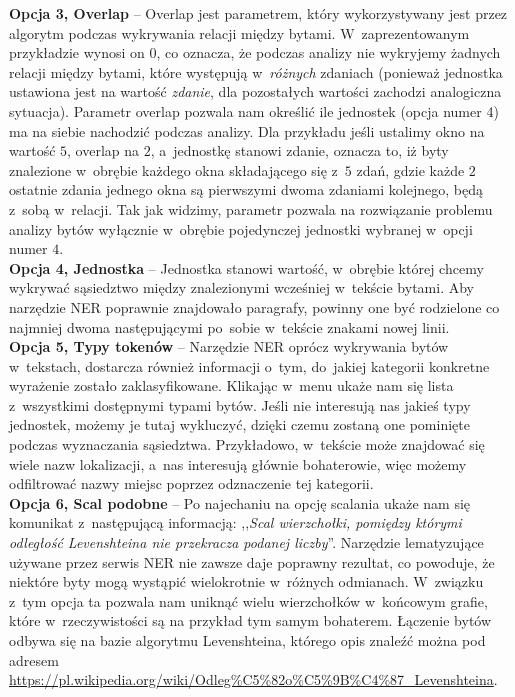 \documentclass[12pt, a4paper]{article}
\begin{document}
\noindent\textbf{Opcja 3, Overlap} -- Overlap jest parametrem, który wykorzystywany jest przez algorytm podczas wykrywania relacji między bytami. W~zaprezentowanym przykładzie wynosi on $0$, co oznacza, że podczas analizy nie wykryjemy żadnych relacji między bytami, które występują w~\textit{różnych} zdaniach (ponieważ jednostka ustawiona jest na wartość \textit{zdanie}, dla pozostałych wartości zachodzi analogiczna sytuacja). Parametr overlap pozwala nam określić ile jednostek (opcja numer 4) ma na siebie nachodzić podczas analizy. Dla przykładu jeśli ustalimy okno na wartość $5$, overlap na $2$, a~jednostkę stanowi zdanie, oznacza to, iż byty znalezione w~obrębie każdego okna składającego się z~$5$ zdań, gdzie każde $2$ ostatnie zdania jednego okna są pierwszymi dwoma zdaniami kolejnego, będą z~sobą w~relacji. Tak jak widzimy, parametr pozwala na rozwiązanie problemu analizy bytów wyłącznie w~obrębie pojedynczej jednostki wybranej w~opcji numer $4$.\\

\noindent\textbf{Opcja 4, Jednostka} -- Jednostka stanowi wartość, w~obrębie której chcemy wykrywać sąsiedztwo między znalezionymi wcześniej w~tekście bytami. Aby narzędzie NER poprawnie znajdowało paragrafy, powinny one być rodzielone co najmniej dwoma następującymi po~sobie w~tekście znakami nowej linii.\\

\noindent\textbf{Opcja 5, Typy tokenów} -- Narzędzie NER oprócz wykrywania bytów w~tekstach, dostarcza również informacji o~tym, do~jakiej kategorii konkretne wyrażenie zostało zaklasyfikowane. Klikając w~menu ukaże nam się lista z~wszystkimi dostępnymi typami bytów. Jeśli nie interesują nas jakieś typy jednostek, możemy je tutaj wykluczyć, dzięki czemu zostaną one pominięte podczas wyznaczania sąsiedztwa. Przykładowo, w~tekście może znajdować się wiele nazw lokalizacji, a~nas interesują głównie bohaterowie, więc możemy odfiltrować nazwy miejsc poprzez odznaczenie tej kategorii.\\

\noindent\textbf{Opcja 6, Scal podobne} -- Po najechaniu na opcję scalania ukaże nam się komunikat z~następującą informacją: ,,\textit{Scal wierzchołki, pomiędzy którymi odległość Levenshteina nie przekracza podanej liczby}''. Narzędzie lematyzujące używane przez serwis NER nie zawsze daje poprawny rezultat, co powoduje, że niektóre byty mogą wystąpić wielokrotnie w~różnych odmianach. W~związku z~tym opcja ta pozwala nam uniknąć wielu wierzchołków w~końcowym grafie, które w~rzeczywistości są na przykład tym samym bohaterem. Łączenie bytów odbywa się na bazie algorytmu Levenshteina, którego opis znaleźć można pod adresem \url{https://pl.wikipedia.org/wiki/Odleg\%C5\%82o\%C5\%9B\%C4\%87_Levenshteina}.\\
\end{document}
